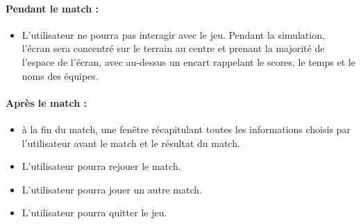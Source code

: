 \paragraph{Pendant le match :}

\begin{itemize}
    \item L’utilisateur ne pourra pas interagir avec le jeu. Pendant la simulation, l'écran sera concentré sur le terrain au centre et prenant la majorité de l’espace de l'écran, avec au-dessus un encart rappelant le scores, le temps et le noms des équipes.
\end{itemize}

\paragraph{Après le match :}

\begin{itemize}
    \item à la fin du match, une fenêtre récapitulant toutes les informations choisis par l’utilisateur avant le match et le résultat du match.

    \vspace{10pt}

    \item L'utilisateur pourra rejouer le match.

    \vspace{10pt}

    \item L'utilisateur pourra jouer un autre match.

    \vspace{10pt}

    \item L'utilisateur pourra quitter le jeu.
    
\end{itemize}